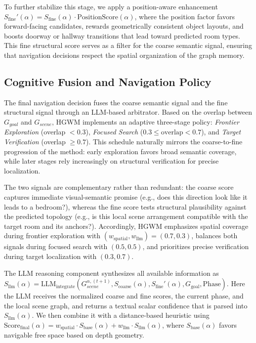 \documentclass{article}
\begin{document}
To further stabilize this stage, we apply a position-aware enhancement $S_{\text{fine}}'(\alpha) = S_{\text{fine}}(\alpha)\cdot \text{PositionScore}(\alpha)$, where the position factor favors forward-facing candidates, rewards geometrically consistent object layouts, and boosts doorway or hallway transitions that lead toward predicted room types. This fine structural score serves as a filter for the coarse semantic signal, ensuring that navigation decisions respect the spatial organization of the graph memory.

\subsection{Cognitive Fusion and Navigation Policy}

The final navigation decision fuses the coarse semantic signal and the fine structural signal through an LLM-based arbitrator. Based on the overlap between $G_{goal}$ and $G_{scene}$, HGWM implements an adaptive three-stage policy: \textit{Frontier Exploration} (overlap $< 0.3$), \textit{Focused Search} ($0.3 \leq \text{overlap} < 0.7$), and \textit{Target Verification} (overlap $\geq 0.7$). This schedule naturally mirrors the coarse-to-fine progression of the method: early exploration favors broad semantic coverage, while later stages rely increasingly on structural verification for precise localization.

The two signals are complementary rather than redundant: the coarse score captures immediate visual-semantic promise (e.g., does this direction look like it leads to a bedroom?), whereas the fine score tests structural plausibility against the predicted topology (e.g., is this local scene arrangement compatible with the target room and its anchors?). Accordingly, HGWM emphasizes spatial coverage during frontier exploration with $(w_{\text{spatial}}, w_{\text{llm}})=(0.7, 0.3)$, balances both signals during focused search with $(0.5, 0.5)$, and prioritizes precise verification during target localization with $(0.3, 0.7)$.

The LLM reasoning component synthesizes all available information as $S_{\text{llm}}(\alpha) = \text{LLM}_{\text{integrate}}(G_{scene}^{\alpha,(t+1)}, S_{\text{coarse}}(\alpha), S_{\text{fine}}'(\alpha), G_{\text{goal}}, \text{Phase})$. Here the LLM receives the normalized coarse and fine scores, the current phase, and the local scene graph, and returns a textual scalar confidence that is parsed into $S_{\text{llm}}(\alpha)$. We then combine it with a distance-based heuristic using $\text{Score}_{\text{final}}(\alpha) = w_{\text{spatial}} \cdot S_{\text{base}}(\alpha) + w_{\text{llm}} \cdot S_{\text{llm}}(\alpha)$, where $S_{\text{base}}(\alpha)$ favors navigable free space based on depth geometry.
\end{document}
